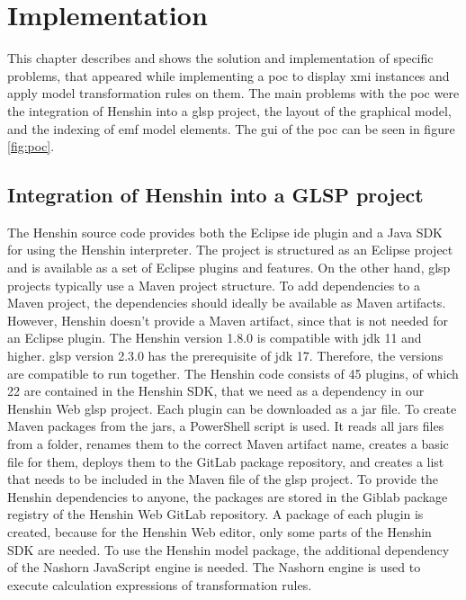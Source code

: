 \section{Implementation}
  \label{subsec:implementation}
  This chapter describes and shows the solution and implementation of specific problems, that appeared while implementing a \ac{poc} to display \ac{xmi} instances and apply model transformation rules on them. The main problems with the \ac{poc} were the integration of Henshin into a \ac{glsp} project, the layout of the graphical model, and the indexing of \ac{emf} model elements. The \acs{gui} of the \ac{poc} can be seen in figure \ref{fig:poc}.

  \subsection{Integration of Henshin into a GLSP project} 
  \label{subsec:henshin-glsp}

  The Henshin source code provides both the Eclipse \ac{ide} plugin and a Java SDK for using the Henshin interpreter. The project is structured as an Eclipse project and is available as a set of Eclipse plugins and features. \cite{henshin-repo} On the other hand, \ac{glsp} projects typically use a Maven project structure. \cite{glsp-repo} To add dependencies to a Maven project, the dependencies should ideally be available as Maven artifacts. However, Henshin doesn't provide a Maven artifact, since that is not needed for an Eclipse plugin. The Henshin version 1.8.0 is compatible with \acs{jdk} 11 and higher. \ac{glsp} version 2.3.0 has the prerequisite of \acs{jdk} 17. Therefore, the versions are compatible to run together. The Henshin code consists of 45 plugins, of which 22 are contained in the Henshin SDK, that we need as a dependency in our Henshin Web \ac{glsp} project. Each plugin can be downloaded as a \acs{jar} file. To create Maven packages from the \acsp{jar}, a PowerShell script is used. It reads all \acsp{jar} files from a folder, renames them to the correct Maven artifact name, creates a basic  file for them, deploys them to the GitLab package repository, and creates a list that needs to be included in the Maven  file of the \ac{glsp} project. To provide the Henshin dependencies to anyone, the packages are stored in the Giblab package registry of the Henshin Web GitLab repository. A package of each plugin is created, because for the Henshin Web editor, only some parts of the Henshin SDK are needed. To use the Henshin model package, the additional dependency of the Nashorn JavaScript engine \cite{nashorn-repo} is needed. The Nashorn engine is used to execute calculation expressions of transformation rules. \cite{henshin}


